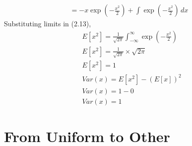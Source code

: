\documentclass[journal,12pt,twocolumn]{IEEEtran}
\renewcommand\thesection{\arabic{section}}
\providecommand{\brak}[1]{\ensuremath{\left(#1\right)}}
\theoremstyle{remark}
\numberwithin{equation}{section}
\begin{document}
\begin{enumerate}[label=\thesection.\arabic*
,ref=\thesection.\theenumi]
\begin{align}
	 = -x\exp\brak{-\frac{x^2}{2}} + \int \exp\brak{-\frac{x^2}{2}} \,dx 
\end{align}
Substituting limits in (2.13),
\begin{align}
	&E[x^2] = \frac{1}{\sqrt{2\pi}} \int_{-\infty}^{\infty} \exp\brak{-\frac{x^2}{2}} \\
	&E[x^2] = \frac{1}{\sqrt{2\pi}} \times \sqrt{2\pi} \\
	&E[x^2] = 1 \\
	&Var(x) = E[x^2] - \left(E[x]\right)^2 \\
	&Var(x) = 1 - 0 \\
	&Var(x) = 1
\end{align}
\end{enumerate}

\section{From Uniform to Other}
\end{document}
